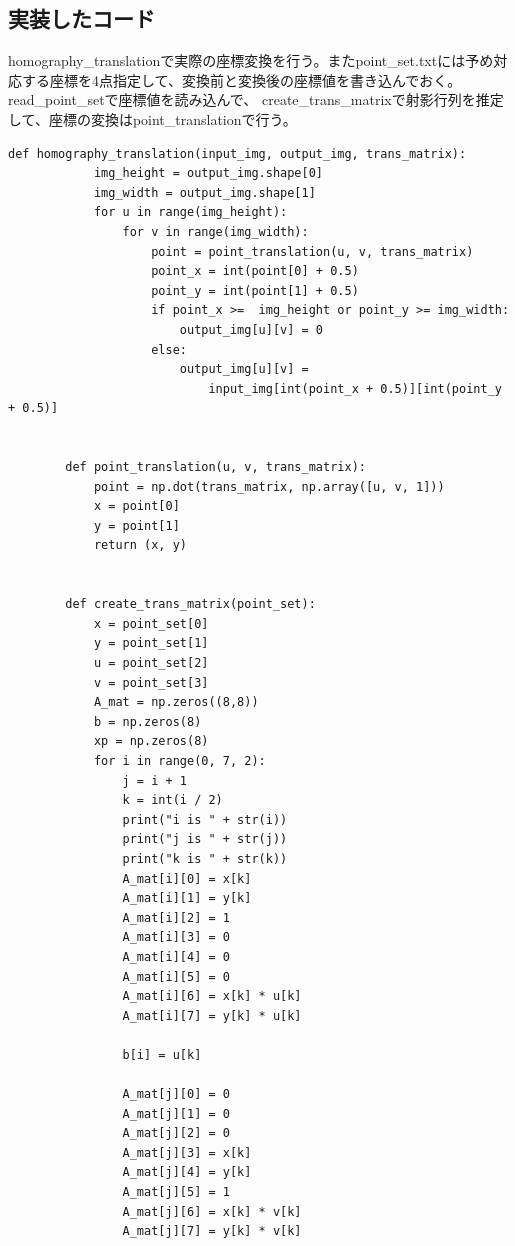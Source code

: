 \documentclass[11pt,a4j]{jsarticle}
\begin{document}
    \subsection{実装したコード}
    homography\_translationで実際の座標変換を行う。またpoint\_set.txtには予め対応する座標を4点指定して、変換前と変換後の座標値を書き込んでおく。read\_point\_setで座標値を読み込んで、
    create\_trans\_matrixで射影行列を推定して、座標の変換はpoint\_translationで行う。
    \begin{lstlisting}[basicstyle=\ttfamily\footnotesize, frame=single]
        def homography_translation(input_img, output_img, trans_matrix):
            img_height = output_img.shape[0]
            img_width = output_img.shape[1]
            for u in range(img_height):
                for v in range(img_width):
                    point = point_translation(u, v, trans_matrix)
                    point_x = int(point[0] + 0.5)
                    point_y = int(point[1] + 0.5)
                    if point_x >=  img_height or point_y >= img_width:
                        output_img[u][v] = 0
                    else:
                        output_img[u][v] =
                            input_img[int(point_x + 0.5)][int(point_y + 0.5)]


        def point_translation(u, v, trans_matrix):
            point = np.dot(trans_matrix, np.array([u, v, 1]))
            x = point[0]
            y = point[1]
            return (x, y)


        def create_trans_matrix(point_set):
            x = point_set[0]
            y = point_set[1]
            u = point_set[2]
            v = point_set[3]
            A_mat = np.zeros((8,8))
            b = np.zeros(8)
            xp = np.zeros(8)
            for i in range(0, 7, 2):
                j = i + 1
                k = int(i / 2)
                print("i is " + str(i))
                print("j is " + str(j))
                print("k is " + str(k))
                A_mat[i][0] = x[k]
                A_mat[i][1] = y[k]
                A_mat[i][2] = 1
                A_mat[i][3] = 0
                A_mat[i][4] = 0
                A_mat[i][5] = 0
                A_mat[i][6] = x[k] * u[k]
                A_mat[i][7] = y[k] * u[k]

                b[i] = u[k]

                A_mat[j][0] = 0
                A_mat[j][1] = 0
                A_mat[j][2] = 0
                A_mat[j][3] = x[k]
                A_mat[j][4] = y[k]
                A_mat[j][5] = 1
                A_mat[j][6] = x[k] * v[k]
                A_mat[j][7] = y[k] * v[k]


\end{lstlisting}
\end{document}
